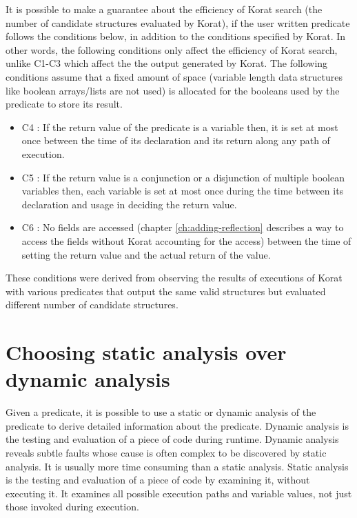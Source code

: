 \para It is possible to make a guarantee about the efficiency of Korat
search (the number of candidate structures evaluated by Korat), if the
user written predicate follows the conditions below, in addition to
the conditions specified by Korat. In other words, the following
conditions only affect the efficiency of Korat search, unlike C1-C3
which affect the the output generated by Korat. The following
conditions assume that a fixed amount of space (variable length data
structures like boolean arrays/lists are not used) is allocated for
the booleans used by the predicate to store its result.
\begin{itemize}
\item C4 : If the return value of the predicate is a variable then, it
  is set at most once between the time of its declaration and its
  return along any path of execution.
\item C5 : If the return value is a conjunction or a disjunction of
  multiple boolean variables then, each variable is set at most once
  during the time between its declaration and usage in deciding the
  return value.
\item C6 : No fields are accessed (chapter \ref{ch:adding-reflection}
  describes a way to access the fields without Korat accounting for
  the access) between the time of setting the return value and the
  actual return of the value.
\end{itemize}

\para These conditions were derived from observing the results of
executions of Korat with various predicates that output the same
valid structures but evaluated different number of candidate
structures.

\section{Choosing static analysis over dynamic analysis}
\label{sec:choosing-static-over-dynamic}
Given a predicate, it is possible to use a static or dynamic analysis
of the predicate to derive detailed information about the
predicate. Dynamic analysis is the testing and evaluation of a piece of
code during runtime. Dynamic analysis reveals subtle faults whose
cause is often complex to be discovered by static analysis. It is
usually more time consuming than a static analysis. Static analysis is
the testing and evaluation of a piece of code by examining it, without
executing it. It examines all possible execution paths and variable
values, not just those invoked during execution.


